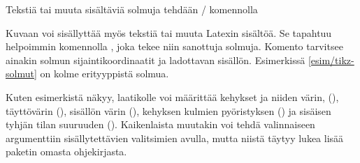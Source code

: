 \begin{esimerkki*}

\begin{koodilohko}
\end{koodilohko}

  \begin{tulos}
  \end{tulos}

  \caption{Tekstiä tai muuta sisältäviä solmuja tehdään
    \-/ komennolla}
  \label{esim/tikz-solmut}
\end{esimerkki*}

Kuvaan voi sisällyttää myös tekstiä tai muuta Latexin sisältöä. Se
tapahtuu helpoimmin komennolla , joka tekee niin sanottuja
solmuja. Komento tarvitsee ainakin solmun sijaintikoordinaatit ja
ladottavan sisällön. Esimerkissä \ref{esim/tikz-solmut} on kolme
erityyppistä solmua.

Kuten esimerkistä näkyy, laatikolle voi määrittää kehykset ja niiden
värin, (), täyttövärin (), sisällön värin
(), kehyksen kulmien pyöristyksen () ja sisäisen tyhjän tilan suuruuden ().
Kaikenlaista muutakin voi tehdä valinnaiseen argumenttiin
sisällytettävien valitsimien avulla, mutta niistä täytyy lukea lisää
paketin omasta ohjekirjasta.

